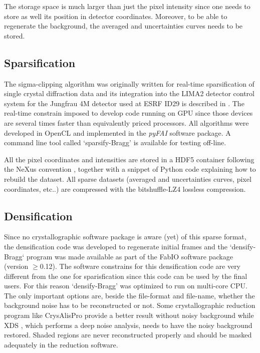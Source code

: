 \documentclass[preprint]{iucr}              %
\begin{document}
The storage space is much larger than just the pixel intensity since one needs to store as well its position in detector coordinates. 
Moreover, to be able to regenerate the background, the averaged and uncertainties curves needs to be stored.



\subsection{Sparsification}

The sigma-clipping algorithm was originally written for real-time sparsification of single crystal diffraction data and its integration into the LIMA2 detector control system \cite{lima} for the Jungfrau 4M detector used at ESRF ID29 is described in \cite{sri2021}.
The real-time constrain imposed to develop code running on GPU since those devices are several times
faster than equivalently priced processors.
All algorithms were developed in OpenCL \cite{opencl_khronos} and implemented in the \textit{pyFAI} software package.
A command line tool called `sparsify-Bragg' is available for testing off-line.

All the pixel coordinates and intensities are stored in a HDF5 container \cite{hdf5} following the NeXus  convention \cite{nexus}, together with a snippet of Python code explaining how to rebuild the dataset.
All sparse datasets (averaged and uncertainties curves, pixel coordinates, etc..) are compressed with the bitshuffle-LZ4 \cite{bitshuffle} lossless compression.

\subsection{Densification}
Since no crystallographic software package is aware (yet) of this sparse format, the densification code was developed to regenerate initial frames and the `densify-Bragg` program was made available as part of the FabIO \cite{fabio} software package (version $\ge$0.12). 
The software constrains for this densification code are very different from the one for sparisfication since this code can be used by the final users.
For this reason `densify-Bragg' was optimized to run on multi-core CPU.
The only important options are, beside the file-format and file-name, whether the background noise has to be reconstructed or not. 
Some crystallographic reduction program like CrysAlisPro \cite{crysalis} provide a better result without noisy background while XDS \cite{xds}, which performs a deep noise analysis, needs to have the noisy background restored. 
Shaded regions are never reconstructed properly and should be masked adequately in the reduction software.
\end{document}
